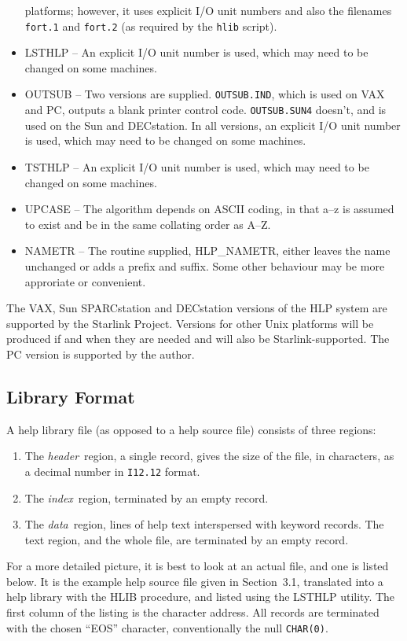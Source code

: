 \documentclass[11pt,nolof]{starlink}
\begin{document}
\begin{itemize}
platforms;  however, it uses explicit I/O unit numbers and also the
filenames \texttt{fort.1} and \texttt{fort.2} (as required by the \texttt{hlib}
script).
\item LSTHLP -- An explicit I/O unit number is used, which may need to
be changed on some machines.
\item OUTSUB -- Two versions are supplied.
\texttt{OUTSUB.IND}, which is used on VAX and PC, outputs
a blank printer control code. \texttt{OUTSUB.SUN4} doesn't, and is
used on the Sun and DECstation.
In all versions, an explicit I/O unit number is used,
which may need to be changed on some machines.
\item TSTHLP -- An explicit I/O unit number is used, which may need to
be changed on some machines.
\item UPCASE -- The algorithm depends on ASCII coding, in that
a--z is assumed to exist and be in the same collating order as A--Z.
\item NAMETR -- The routine supplied, HLP\_NAMETR, either leaves
the name unchanged or adds a prefix and suffix.  Some
other behaviour may be more approriate or convenient.
\end{itemize}

The VAX, Sun SPARCstation and DECstation versions of the HLP system
are supported by the Starlink Project.  Versions for other Unix
platforms will be produced if and when they are needed and will
also be Starlink-supported.  The PC version is supported by the author.

\subsection{Library Format}
A help library file (as opposed to a help source file)
consists of three regions:
\begin{enumerate}
\item The \textit{header}\, region, a single record, gives the size of the
file, in characters, as a decimal number in \texttt{I12.12} format.
\item The \textit{index}\, region, terminated by an empty record.
\item The \textit{data}\, region, lines of help
text interspersed with keyword records.  The text region, and
the whole file, are terminated by an empty record.
\end{enumerate}

For a more detailed picture, it is best to look at an
actual file, and one is listed below.  It is the
example help source file given in Section~3.1, translated
into a help library with the HLIB procedure, and listed using the
LSTHLP utility.
The first column of the listing is the character address.  All
records are terminated with the chosen ``EOS'' character,
conventionally the null \texttt{CHAR(0)}.
\end{document}
